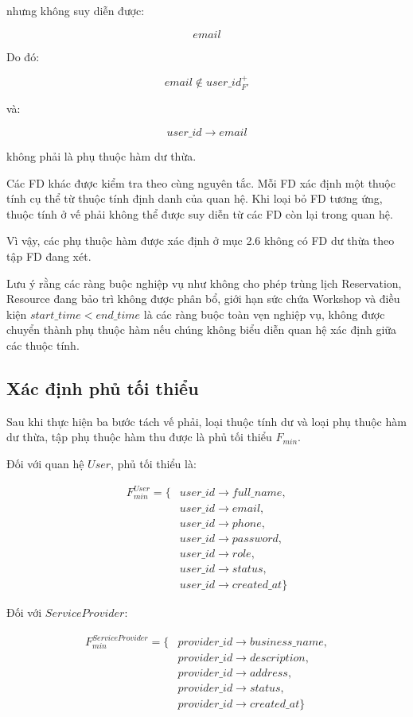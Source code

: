 nhưng không suy diễn được:

\[
email
\]

Do đó:

\[
email \notin user\_id^+_{F'}
\]

và:

\[
user\_id\rightarrow email
\]

không phải là phụ thuộc hàm dư thừa.

Các FD khác được kiểm tra theo cùng nguyên tắc. Mỗi FD xác định một thuộc
tính cụ thể từ thuộc tính định danh của quan hệ. Khi loại bỏ FD tương ứng,
thuộc tính ở vế phải không thể được suy diễn từ các FD còn lại trong quan hệ.

Vì vậy, các phụ thuộc hàm được xác định ở mục 2.6 không có FD dư thừa theo
tập FD đang xét.

Lưu ý rằng các ràng buộc nghiệp vụ như không cho phép trùng lịch
Reservation, Resource đang bảo trì không được phân bổ, giới hạn sức chứa
Workshop và điều kiện $start\_time < end\_time$ là các ràng buộc toàn vẹn
nghiệp vụ, không được chuyển thành phụ thuộc hàm nếu chúng không biểu diễn
quan hệ xác định giữa các thuộc tính.

\subsection{Xác định phủ tối thiểu}

Sau khi thực hiện ba bước tách vế phải, loại thuộc tính dư và loại phụ thuộc
hàm dư thừa, tập phụ thuộc hàm thu được là phủ tối thiểu $F_{min}$.

Đối với quan hệ $User$, phủ tối thiểu là:

\[
\begin{aligned}
	F_{min}^{User}=\{&
	user\_id\rightarrow full\_name,\\
	&user\_id\rightarrow email,\\
	&user\_id\rightarrow phone,\\
	&user\_id\rightarrow password,\\
	&user\_id\rightarrow role,\\
	&user\_id\rightarrow status,\\
	&user\_id\rightarrow created\_at
	\}
\end{aligned}
\]

Đối với $ServiceProvider$:

\[
\begin{aligned}
	F_{min}^{ServiceProvider}=\{&
	provider\_id\rightarrow business\_name,\\
	&provider\_id\rightarrow description,\\
	&provider\_id\rightarrow address,\\
	&provider\_id\rightarrow status,\\
	&provider\_id\rightarrow created\_at
	\}
\end{aligned}
\]

